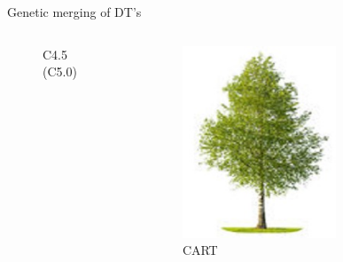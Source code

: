 \documentclass[english]{beamer}
\begin{document}
\begin{frame}{Genetic merging of DT's}
\begin{columns}
\begin{column}{0.25\textwidth}
\begin{figure}
				\caption{C4.5 (C5.0)}
			\end{figure}
		\end{column}
		\begin{column}{0.25\textwidth}
			\centering
			\begin{figure}
				\includegraphics[width=\textwidth]{figures/berk.jpg}
				\caption{CART}
			\end{figure}
		\end{column}
		\begin{column}{0.25\textwidth}
			\centering
			\begin{figure}

\end{figure}
\end{column}
\end{columns}
\end{frame}
\end{document}
